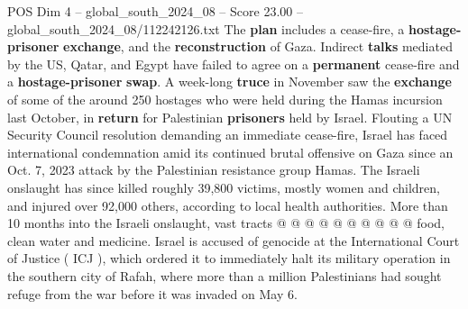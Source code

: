 \begin{textsample}{POS Dim 4 – global\_south\_2024\_08 – Score 23.00 – global\_south\_2024\_08/112242126.txt}
The \textbf{plan} includes a cease-fire, a \textbf{hostage-prisoner} \textbf{exchange}, and the \textbf{reconstruction} of Gaza.
Indirect \textbf{talks} mediated by the US, Qatar, and Egypt have failed to agree on a \textbf{permanent} cease-fire and a \textbf{hostage-prisoner} \textbf{swap}.
A week-long \textbf{truce} in November saw the \textbf{exchange} of some of the around 250 hostages who were held during the Hamas incursion last October, in \textbf{return} for Palestinian \textbf{prisoners} held by Israel.
Flouting a UN Security Council resolution demanding an immediate cease-fire, Israel has faced international condemnation amid its continued brutal offensive on Gaza since an Oct. 7, 2023 attack by the Palestinian resistance group Hamas.
The Israeli onslaught has since killed roughly 39,800 victims, mostly women and children, and injured over 92,000 others, according to local health authorities.
More than 10 months into the Israeli onslaught, vast tracts @ @ @ @ @ @ @ @ @ @ food, clean water and medicine.
Israel is accused of genocide at the International Court of Justice ( ICJ ), which ordered it to immediately halt its military operation in the southern city of Rafah, where more than a million Palestinians had sought refuge from the war before it was invaded on May 6.

\end{textsample}

